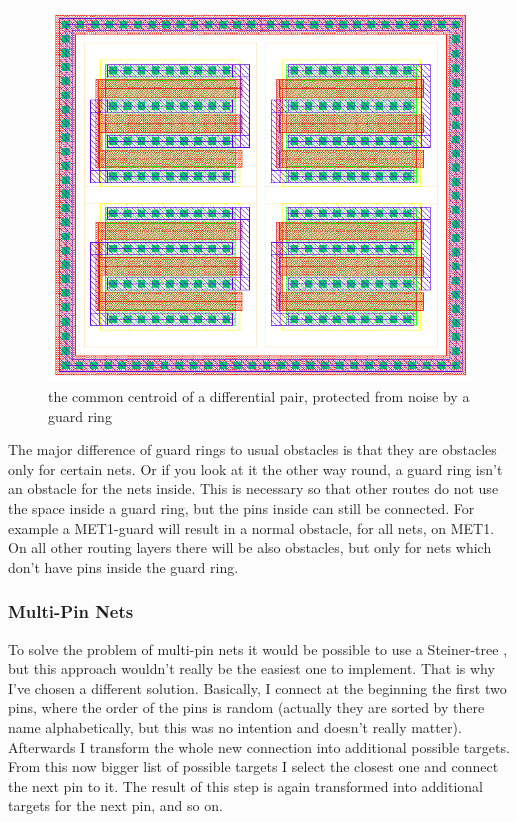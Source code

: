 \begin{figure}
	\centering
	\includegraphics[scale=.6]{FIG/guard_ring.png}
  	\caption{the common centroid of a differential pair, protected from noise by a guard ring}
	\label{fig:guard_ring}
\end{figure}

The major difference of guard rings to usual obstacles is that they are obstacles only for certain nets. Or if you look at it the other way round, a guard ring isn't an obstacle for the nets inside. This is necessary so that other routes do not use the space inside a guard ring, but the pins inside can still be connected. For example a MET1-guard will result in a normal obstacle, for all nets, on MET1. On all other routing layers there will be also obstacles, but only for nets which don't have pins inside the guard ring.

\subsubsection{Multi-Pin Nets}
To solve the problem of multi-pin nets it would be possible to use a Steiner-tree , but this approach wouldn't really be the easiest one to implement. That is why I've chosen a different solution. Basically, I connect at the beginning the first two pins, where the order of the pins is random (actually they are sorted by there name alphabetically, but this was no intention and doesn't really matter). Afterwards I transform the whole new connection into additional possible targets. From this now bigger list of possible targets I select the closest one and connect the next pin to it. The result of this step is again transformed into additional targets for the next pin, and so on.

